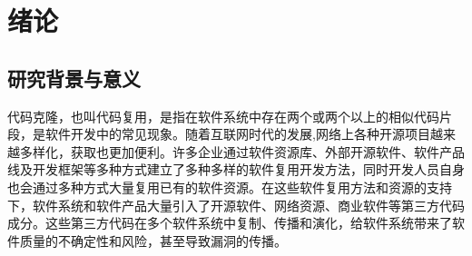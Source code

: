 \chapter{绪论}
\label{chap:intro}
\section{研究背景与意义}
代码克隆，也叫代码复用，是指在软件系统中存在两个或两个以上的相似代码片段\cite{乐乔艺2021代码克隆检测研究进展综述}，是软件开发中的常见现象。随着互联网时代的发展,网络上各种开源项目越来越多样化，获取也更加便利。许多企业通过软件资源库、外部开源软件、软件产品线及开发框架等多种方式建立了多种多样的软件复用开发方法，同时开发人员自身也会通过多种方式大量复用已有的软件资源。在这些软件复用方法和资源的支持下，软件系统和软件产品大量引入了开源软件、网络资源、商业软件等第三方代码成分。这些第三方代码在多个软件系统中复制、传播和演化，给软件系统带来了软件质量的不确定性和风险，甚至导致漏洞的传播。

